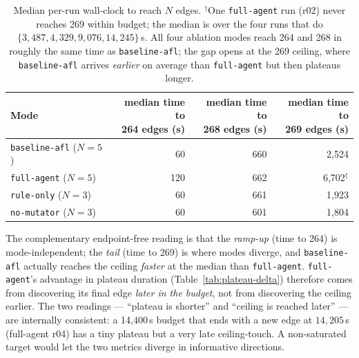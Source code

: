 \documentclass[11pt]{article}
\begin{document}
\begin{table}[t]
  \centering
  \footnotesize
  \setlength{\tabcolsep}{6pt}
  \begin{tabular}{@{}lrrr@{}}
    \toprule
    Mode & \makecell[r]{median time to\\ 264 edges (s)} & \makecell[r]{median time to\\ 268 edges (s)} & \makecell[r]{median time to\\ 269 edges (s)} \\
    \midrule
    \texttt{baseline-afl} ($N{=}5$)  & 60  & 660 & 2{,}524 \\
    \texttt{full-agent} ($N{=}5$)    & 120 & 662 & 6{,}702$^{\dagger}$ \\
    \texttt{rule-only} ($N{=}3$)     & 60  & 661 & 1{,}923 \\
    \texttt{no-mutator} ($N{=}3$)    & 60  & 601 & 1{,}804 \\
    \bottomrule
  \end{tabular}
  \caption{Median per-run wall-clock to reach $N$ edges.
  $^{\dagger}$One \texttt{full-agent} run (r02) never reaches 269
  within budget; the median is over the four runs that do
  $\{3{,}487, 4{,}329, 9{,}076, 14{,}245\}$\,s. All four ablation
  modes reach 264 and 268 in roughly the same time as
  \texttt{baseline-afl}; the gap opens at the 269 ceiling, where
  \texttt{baseline-afl} arrives \emph{earlier} on average than
  \texttt{full-agent} but then plateaus longer.}
  \label{tab:time-to-n}
\end{table}

The complementary endpoint-free reading is that the
\emph{ramp-up} (time to 264) is mode-independent; the
\emph{tail} (time to 269) is where modes diverge, and
\texttt{baseline-afl} actually reaches the ceiling
\emph{faster} at the median than \texttt{full-agent}.
\texttt{full-agent}'s advantage in plateau duration
(Table~\ref{tab:plateau-delta}) therefore comes from
discovering its final edge \emph{later in the budget}, not from
discovering the ceiling earlier. The two readings ---
``plateau is shorter'' and ``ceiling is reached later'' --- are
internally consistent: a 14{,}400\,s budget that ends with a new
edge at $14{,}205$\,s (full-agent r04) has a tiny plateau but a
very late ceiling-touch. A non-saturated target would let the
two metrics diverge in informative directions.
\end{document}
